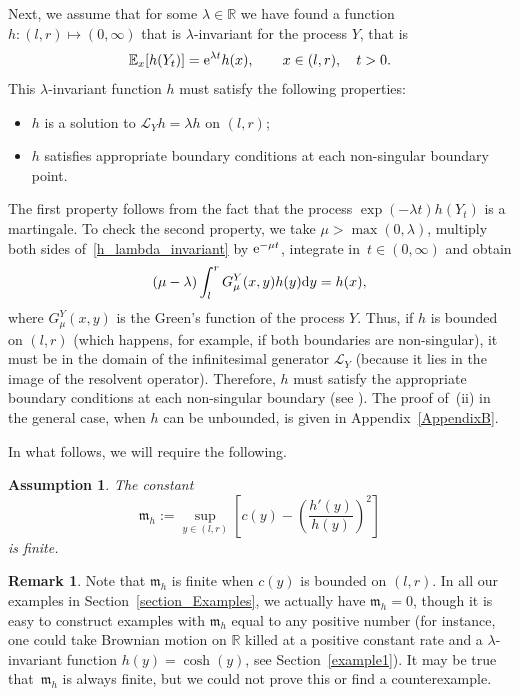 \documentclass[10pt,a4paper]{amsart}
\numberwithin{equation}{section}
\newtheorem{Assumption}[Theorem]{Assumption}
\theoremstyle{definition}
\newtheorem{Remark}[Theorem]{Remark}
\def\L{{\mathcal L}}
\def\e{{\mathbb E}}
\def\r{{\mathbb R}}
\def\d{{\textnormal d}}
\begin{document}
Next, we assume that for some $\lambda \in \r$ we have found a function $h \colon (l,r) \mapsto (0,\infty)$ that is $\lambda$-invariant for the process $Y$, that is
\begin{equation}\label{h_lambda_invariant}
\e_x[h(Y_t)]={\rm e}^{\lambda t} h(x), \qquad x\in (l,r), \quad t>0.
\end{equation}
This $\lambda$-invariant function $h$ must satisfy the following properties:
\begin{itemize}\itemsep=0pt
\item[(i)] $h$ is a solution to $\L_Y h = \lambda h$ on $(l,r)$;
\item[(ii)]%
$h$ satisfies appropriate boundary conditions at each non-singular boundary point.
\end{itemize}
The first property follows from the fact that the process $\exp(-\lambda t) h(Y_t)$ is a martingale. To check the second property, we take $\mu> \max(0,\lambda)$, multiply both sides of~\eqref{h_lambda_invariant} by ${\rm e}^{-\mu t}$, integrate in~${t \in (0,\infty)}$ and obtain
\begin{equation}\label{h_lambda_invariant2}
(\mu - \lambda) \int_l^r G^Y_{\mu}(x,y) h(y) \d y= h(x),
\end{equation}
where $G^Y_{\mu}(x,y)$ is the Green's function of the process $Y$. Thus, if $h$ is bounded on $(l,r)$ (which happens, for example, if both boundaries are non-singular), it must be in the domain of the infinitesimal generator $\L_Y$ (because it lies in the image of the resolvent operator). Therefore, $h$ must satisfy the appropriate boundary conditions at each non-singular boundary (see \cite[Section~II.7]{Borodin2002}). The proof of~(ii) in the general case, when $h$ can be unbounded, is given in Appendix~\ref{AppendixB}.

In what follows, we will require the following.

\begin{Assumption}\label{Assumption_1}
The constant
\begin{equation}\label{def_m_h}
{\mathfrak m}_h:= \sup\limits_{y\in (l,r)} \left[ c(y)- \left(\frac{h'(y)}{h(y)}\right)^2 \right]
\end{equation}
is finite.
\end{Assumption}

\begin{Remark}
 Note that ${\mathfrak m}_h$ is finite when $c(y)$ is bounded on $(l,r)$. In all our examples in Section~\ref{section_Examples}, we actually have ${\mathfrak m}_h=0$, though it is easy to construct examples with ${\mathfrak m}_h$ equal to any positive number (for instance, one could take Brownian motion on $\r$ killed at a positive constant rate and a
 $\lambda$-invariant function $h(y)=\cosh(y)$, see Section~\ref{example1}). It may be true that~${\mathfrak m}_h$ is always finite, but we could not prove this or find a counterexample.
\end{Remark}
\end{document}
